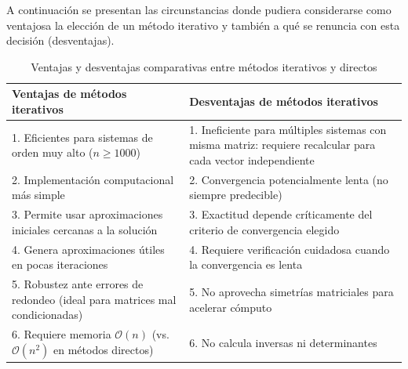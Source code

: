 \documentclass[12pt,letterpaper]{article}
\theoremstyle{definition}
\theoremstyle{plain}
\theoremstyle{remark}
\begin{document}
A continuación se presentan las circunstancias donde pudiera considerarse como ventajosa la elección de un método iterativo y también a qué se renuncia con esta decisión (desventajas).

\begin{table}[htbp]
\centering
\caption{Ventajas y desventajas comparativas entre métodos iterativos y directos}
\label{tab:3.6}
\begin{tabular}{|>{\raggedright\arraybackslash}p{}|>{\raggedright\arraybackslash}p{}|}
\hline
\rowcolor{azulclaro}
\textbf{\color{black}Ventajas de métodos iterativos} & \textbf{\color{black}Desventajas de métodos iterativos} \\
\hline
\cellcolor{azulclaro!50}1. Eficientes para sistemas de orden muy alto ($n \geq 1000$) & \cellcolor{verdeclaro!50}1. Ineficiente para múltiples sistemas con misma matriz: requiere recalcular para cada vector independiente \\ 
\hline
\cellcolor{azulclaro!50}2. Implementación computacional más simple & \cellcolor{verdeclaro!50}2. Convergencia potencialmente lenta (no siempre predecible) \\
\hline
\cellcolor{azulclaro!50}3. Permite usar aproximaciones iniciales cercanas a la solución & \cellcolor{verdeclaro!50}3. Exactitud depende críticamente del criterio de convergencia elegido \\
\hline
\cellcolor{azulclaro!50}4. Genera aproximaciones útiles en pocas iteraciones & \cellcolor{verdeclaro!50}4. Requiere verificación cuidadosa cuando la convergencia es lenta \\
\hline
\cellcolor{azulclaro!50}5. Robustez ante errores de redondeo (ideal para matrices mal condicionadas) & \cellcolor{verdeclaro!50}5. No aprovecha simetrías matriciales para acelerar cómputo \\
\hline
\cellcolor{azulclaro!50}6. Requiere memoria $\mathcal{O}(n)$ (vs. $\mathcal{O}(n^2)$ en métodos directos) & \cellcolor{verdeclaro!50}6. No calcula inversas ni determinantes \\
\hline
\end{tabular}
\end{table}
\end{document}

